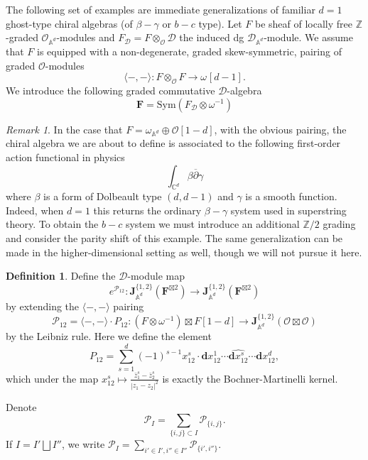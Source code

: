 \documentclass[11pt]{amsart}
\theoremstyle{definition}
\newtheorem{defn}[thm]{Definition}
\theoremstyle{remark}
\newtheorem{rem}[thm]{Remark}
\numberwithin{equation}{section}
\begin{document}
The following set of examples are immediate generalizations of familiar $d=1$ ghost-type chiral algebras (of $\beta-\gamma$ or $b-c$
type).
Let $F$ be sheaf of locally free $\mathbb{Z}$-graded $\mathcal{O}_{\mathbb{A}^d}$-modules and $F_{\mathcal{D}} = F\otimes_{\mathcal{O}}
\mathcal{D} $ the induced dg $\mathcal{D}_{\mathbb{A}^d}$-module.
We assume that $F$ is equipped with a non-degenerate, graded skew-symmetric, pairing of graded $\mathcal{O}$-modules
\begin{equation}\label{eq:pairing}
  \langle - , - \rangle \colon F \otimes_{\mathcal{O}} F \to \omega_{}[d-1] .
\end{equation}
We introduce the following graded commutative $\mathcal{D}$-algebra
$$
\mathbf{F} =\mathrm{Sym}\left(F_{\mathcal{D}} \otimes \omega^{-1}\right)
$$

\begin{rem}
  In the case that $F= \omega_{\mathbb{A}^d}\oplus \mathcal{O}[1-d]$, with the obvious pairing, the chiral algebra we are about to define is associated to the
  following first-order action functional in physics
  \begin{equation}\label{}
    \int_{\mathbb{C}^d} \beta \overline{\partial} \gamma
  \end{equation}
  where $\beta$ is a form of Dolbeault type $(d,d-1)$ and $\gamma$ is a smooth function.
  Indeed, when $d=1$ this returns the ordinary $\beta-\gamma$ system used in superstring theory.
  To obtain the $b-c$ system we must introduce an additional $\mathbb{Z}/2$ grading and consider the parity shift of this
  example.
  The same generalization can be made in the higher-dimensional setting as well, though we will not pursue it here.
\end{rem}

\begin{defn}{\label{WickContraction}}
Define the $\mathcal{D}$-module map
$$
e^{\mathcal{P}_{12}}\colon \mathbf{J}^{\{1,2\}}_{\mathbb{A}^d}(\mathbf{F}^{\boxtimes 2})\rightarrow \mathbf{J}^{\{1,2\}}
_{\mathbb{A}^d}(\mathbf{F}^{\boxtimes 2})
$$
by extending the $\langle - , - \rangle$ pairing
$$
\mathcal{P}_{12} = \langle - , - \rangle\cdot P_{12}  \colon(F\otimes\omega^{-1})\boxtimes F[1-d]\rightarrow \mathbf{J}^{\{1,2\}}_{\mathbb{A}^d}(\mathcal{O}\boxtimes \mathcal{O})
$$
by the Leibniz rule. Here we define the element
$$
P_{12}=\sum^d_{s=1}(-1)^{s-1}x_{12}^s\cdot \mathbf{d}x_{12}^1\cdots \widehat{\mathbf{d}x_{12}^s}\cdots \mathbf{d}x_{12}^d,
$$
 which under the map $x^s_{12}\mapsto \frac{\bar{z}_{1}^{s} - \bar{z}_{2}^{s}}{|z_{1} - z_{2}|^{2}}$ is exactly the Bochner-Martinelli kernel.
\end{defn}
Denote $$ \mathcal{P}_{{I}}=\sum_{\{i,j\}\subset{I}}\mathcal{P}_{\{i,j\}}.
$$
If ${I}={I'}\bigsqcup {I''}$, we write ${\mathcal{P}}_{I}=\sum\limits_{i'\in {I'}, i''\in{I''} }\mathcal{P}_{\{i',i''\}}.$
\end{document}
